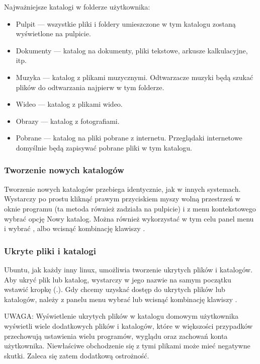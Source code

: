 Najważniejsze katalogi w folderze użytkownika:
\begin{itemize}
\item \textcolor{ubuntu_orange}{Pulpit} --- wszystkie pliki i foldery umieszczone w tym katalogu zostaną wyświetlone na pulpicie.
\item \textcolor{ubuntu_orange}{Dokumenty} --- katalog na dokumenty, pliki tekstowe, arkusze kalkulacyjne, itp.
\item \textcolor{ubuntu_orange}{Muzyka} --- katalog z plikami muzycznymi. Odtwarzacze muzyki będą szukać plików do odtwarzania najpierw w tym folderze.
\item \textcolor{ubuntu_orange}{Wideo} --- katalog z plikami wideo.
\item \textcolor{ubuntu_orange}{Obrazy} --- katalog z fotografiami.
\item \textcolor{ubuntu_orange}{Pobrane} --- katalog na pliki pobrane z internetu. Przeglądaki internetowe domyślnie będą zapisywać pobrane pliki w tym katalogu.
\end{itemize}

\subsubsection{Tworzenie nowych katalogów}
Tworzenie nowych katalogów przebiega identycznie, jak w innych systemach. Wystarczy po prostu kliknąć prawym przyciskiem myszy wolną przestrzeń w oknie programu (ta metoda również zadziała na pulpicie) i z menu kontekstowego wybrać opcję \textcolor{ubuntu_orange}{Nowy katalog}. Można również wykorzystać w tym celu panel menu i wybrać , albo wcisnąć kombinację klawiszy .

\subsubsection{Ukryte pliki i katalogi}
Ubuntu, jak każdy inny linux, umożliwia tworzenie ukrytych plików i katalogów. Aby ukryć plik lub katalog, wystarczy w jego nazwie na samym początku wstawić kropkę (.). Gdy chcemy uzyskać dostęp do ukrytych plików lub katalogów, należy z panelu menu wybrać  lub wcisnąć kombinację klawiszy .

UWAGA: Wyświetlenie ukrytych plików w katalogu domowym użytkownika wyświetli wiele dodatkowych plików i katalogów, które w większości przypadków przechowują ustawienia wielu programów, wyglądu oraz zachowań konta użytkownika. Niewłaściwe obchodzenie się z tymi plikami może mieć negatywne skutki. Zaleca się zatem dodatkową ostrożność.

